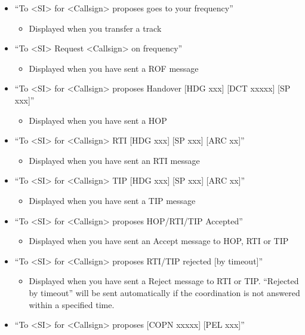 \documentclass[11pt,a4paper]{memoir}
\begin{document}
\begin{itemize}
    \item“To <SI> for <Callsign> proposes goes to your frequency”
        \begin{itemize}
             \item Displayed when you transfer a track
        \end{itemize}
    \item“To <SI> Request <Callsign> on frequency”
        \begin{itemize}
             \item Displayed when you have sent a ROF message
        \end{itemize}
    \item“To <SI> for <Callsign> proposes Handover [HDG xxx] [DCT xxxxx] [SP xxx]”
        \begin{itemize}
             \item Displayed when you have sent a HOP
        \end{itemize}
    \item“To <SI> for <Callsign> RTI [HDG xxx] [SP xxx] [ARC xx]”
        \begin{itemize}
             \item Displayed when you have sent an RTI message
        \end{itemize}
    \item“To <SI> for <Callsign> TIP [HDG xxx] [SP xxx] [ARC xx]”
        \begin{itemize}
             \item Displayed when you have sent a TIP message
        \end{itemize}
    \item“To <SI> for <Callsign> proposes HOP/RTI/TIP Accepted”
        \begin{itemize}
             \item Displayed when you have sent an Accept message to HOP, RTI or TIP
        \end{itemize}
    \item“To <SI> for <Callsign> proposes RTI/TIP rejected [by timeout]”
        \begin{itemize}
             \item Displayed when you have sent a Reject message to RTI or TIP. “Rejected by timeout” will be sent automatically if the coordination is not answered within a specified time.
        \end{itemize}
    \item“To <SI> for <Callsign> proposes [COPN xxxxx] [PEL xxx]”

\end{itemize}
\end{document}

